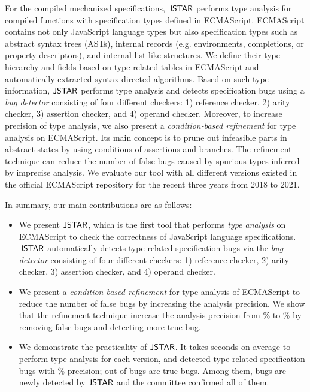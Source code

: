 For the compiled mechanized specifications, $\tool$ performs type analysis for
compiled functions with specification types defined in ECMAScript.  ECMAScript
contains not only JavaScript language types but also specification types such as
abstract syntax trees (ASTs), internal records (e.g. environments, completions,
or property descriptors), and internal list-like structures.  We define their
type hierarchy and fields based on type-related tables in ECMAScript and
automatically extracted syntax-directed algorithms.  Based on such type
information, $\tool$ performs type analysis and detects specification bugs using
a \textit{bug detector} consisting of four different checkers: 1) reference
checker, 2) arity checker, 3) assertion checker, and 4) operand checker.
Moreover, to increase precision of type analysis, we also present a
\textit{condition-based refinement} for type analysis on ECMAScript. Its main
concept is to prune out infeasible parts in abstract states by using conditions
of assertions and branches.  The refinement technique can reduce the number of
false bugs caused by spurious types inferred by imprecise analysis.  We evaluate
our tool with all  different versions existed in the official
ECMAScript repository for the recent three years from 2018 to 2021.

In summary, our main contributions are as follows:
\begin{itemize}
  \item We present $\tool$, which is the first tool that performs \textit{type
    analysis} on ECMAScript to check the correctness of JavaScript language
    specifications.  $\tool$ automatically detects type-related specification
    bugs via the \textit{bug detector} consisting of four different checkers: 1)
    reference checker, 2) arity checker, 3) assertion checker, and 4) operand
    checker.
  \item We present a \textit{condition-based refinement} for type analysis of
    ECMAScript to reduce the number of false bugs by increasing the analysis
    precision.  We show that the refinement technique increase the analysis
    precision from \% to \% by removing 
    false bugs and detecting  more true bug.
  \item We demonstrate the practicality of $\tool$. It takes 
    seconds on average to perform type analysis for each version, and detected
     type-related specification bugs with \% precision;
     out of  bugs are true bugs.  Among them, 
    bugs are newly detected by $\tool$ and the committee confirmed all of them.
\end{itemize}
